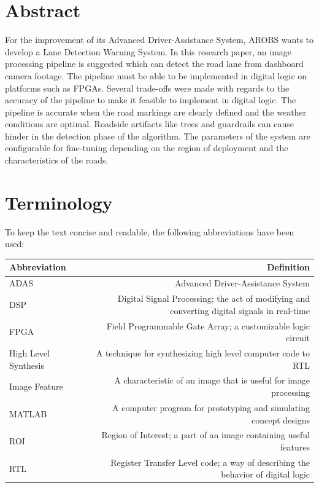 \documentclass{matthijs}
\begin{document}



	\setlength{\parindent}{0cm}
	\setlength{\parskip}{0cm}
	\singlespacing
	\section*{Abstract}
	\label{hoofdstuk:Abstract}
	\onehalfspacing
	\thispagestyle{empty}

	For the improvement of its Advanced Driver-Assistance System, AROBS wants to develop a Lane Detection Warning System.
	In this research paper, an image processing pipeline is suggested which can detect the road lane from dashboard camera footage.
	The pipeline must be able to be implemented in digital logic on platforms such as FPGAs.
	Several trade-offs were made with regards to the accuracy of the pipeline to make it feasible to implement in digital logic.
	The pipeline is accurate when the road markings are clearly defined and the weather conditions are optimal.
	Roadside artifacts like trees and guardrails can cause hinder in the detection phase of the algorithm.
	The parameters of the system are configurable for fine-tuning depending on the region of deployment and the characteristics of the roads.

	\setlength{\parindent}{0cm}
	\setlength{\parskip}{0cm}
	\singlespacing
	\section*{Terminology}
	\label{hoofdstuk:Terminology}
	\onehalfspacing

	To keep the text concise and readable, the following abbreviations have been used:

	\begin{table}[!ht]
		\begin{tabular*}{\textwidth}{l @{\extracolsep{\fill}} R}
			\toprule

			\textbf{Abbreviation} & \textbf{Definition} \\
			\midrule
			ADAS & Advanced Driver-Assistance System \tabularnewline
			DSP & Digital Signal Processing; the act of modifying and converting digital signals in real-time \tabularnewline
			FPGA & Field Programmable Gate Array; a customizable logic circuit \tabularnewline
			High Level Synthesis & A technique for synthesizing high level computer code to RTL \tabularnewline
			Image Feature & A characteristic of an image that is useful for image processing \tabularnewline
			MATLAB & A computer program for prototyping and simulating concept designs \tabularnewline
			ROI & Region of Interest; a part of an image containing useful features \tabularnewline
			RTL & Register Transfer Level code; a way of describing the behavior of digital logic \tabularnewline

			\bottomrule
		\end{tabular*}
		\label{tabel:Abbreviations}
	\end{table}
\end{document}
